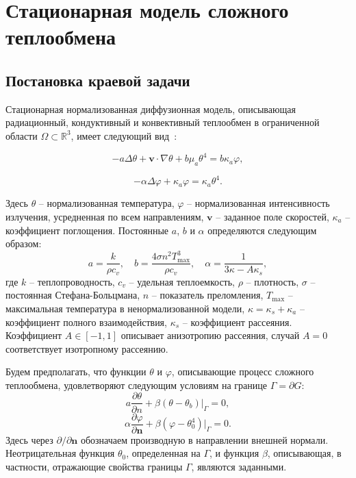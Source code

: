 \section{Стационарная модель сложного теплообмена}\label{sec:ch1/sec3}

\subsection{Постановка краевой задачи}
\label{subsec:ch1/sec3/state}

Стационарная нормализованная диффузионная модель, описывающая
радиационный, кондуктивный и конвективный теплообмен в
ограниченной области $\Omega \subset \mathbb{R}^3$,
имеет следующий вид~\cite{modest2013radiative}:

\begin{equation}
    \label{eq:1_3:4-1}
    -a \Delta \theta + \textbf{v} \cdot \nabla \theta
    + b \mu_a \theta^4 =  b \kappa_a \varphi,
\end{equation}

\begin{equation}
    \label{eq:1_3:4-2}
    - \alpha \Delta \varphi + \kappa_a \varphi = \kappa_a \theta^4.
\end{equation}

Здесь $\theta$ -- нормализованная температура, $\varphi$ --
нормализованная интенсивность излучения, усредненная по всем
направлениям, $\textbf{v}$ -- заданное поле скоростей, $\kappa_a$ --
коэффициент поглощения.
Постоянные $a$, $b$ и $\alpha$
определяются следующим образом:
\[
    a=\frac{k}{\rho c_v},\quad b = \frac{4\sigma n^2 T_{\max}^3}{\rho c_v},
    \quad \alpha=\frac{1}{3\kappa - A \kappa_s},
\]
где $k$ -- теплопроводность, $c_v$ -- удельная теплоемкость, $\rho$ --
плотность, $\sigma$ -- постоянная Стефана-Больцмана, $n$ --
показатель преломления, $T_{\max}$ -- максимальная температура в
ненормализованной модели, $\kappa = \kappa_s + \kappa_a$ -- коэффициент
полного взаимодействия, $\kappa_s$ -- коэффициент рассеяния.
Коэффициент $A \in [-1, 1]$ описывает анизотропию рассеяния, случай
$A=0$ соответствует изотропному рассеянию.

Будем предполагать, что функции $\theta$ и $\varphi$, описывающие
процесс сложного теплообмена, удовлетворяют следующим условиям на
границе $\Gamma = \partial G$:
\begin{equation}
    \label{eq:1_3:4-3}
    a \frac{\partial \theta}{\partial n}
    +\left.\beta\left(\theta-\theta_{b}\right)\right|_{\Gamma}=0,
\end{equation}
\begin{equation}
    \label{eq:1_3:4-4}
    \alpha \frac{\partial \varphi}{\partial \mathbf{n}} + \beta
    (\varphi-\theta_0^4)|_{\Gamma} = 0.
\end{equation}
Здесь через $\partial/\partial \mathbf{n}$ обозначаем производную
в направлении внешней нормали.
Неотрицательная функция
$\theta_{0}$, определенная на $\Gamma$,  и функция $\beta$,
описывающая, в частности, отражающие свойства границы $\Gamma$,
являются заданными.

